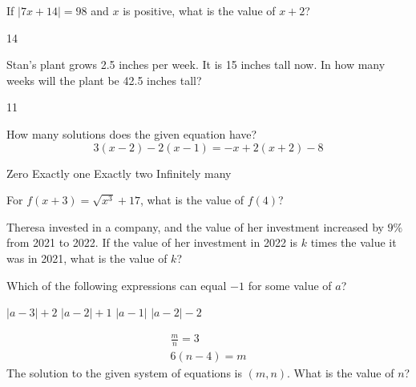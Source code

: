 \newpage




\question[1]
If $|7x+14|=98$ and $x$ is positive, what is the value of $x+2$?
\begin{solution}
14
\end{solution}

\question[1]
Stan's plant grows 2.5 inches per week. It is 15 inches tall now. In how many weeks will the plant be 42.5 inches tall?
\begin{solution}
11
\end{solution}

\question[1]
How many solutions does the given equation have?
\[
  3(x-2)-2(x-1)=-x+2(x+2)-8
\]
\begin{choices}
  \choice Zero
  \choice Exactly one
  \choice Exactly two
  \CorrectChoice Infinitely many
\end{choices}

\question[1]
For $f(x+3)=\sqrt{x^3}+17$, what is the value of $f(4)$?
\begin{choices}
\end{choices}





\newpage



\question[1]
Theresa invested in a company, and the value of her investment increased by $9\%$ from 2021 to 2022. If the value of her investment in 2022 is $k$ times the value it was in 2021, what is the value of $k$?
\begin{choices}
\end{choices}

\question[1]
Which of the following expressions can equal $-1$ for some value of $a$?
\begin{choices}
  \choice $|a-3|+2$
  \choice $|a-2|+1$
  \choice $|a-1|$
  \CorrectChoice $|a-2|-2$
\end{choices}

\question[1]
\[
  \begin{gathered}
  \frac{m}{n}=3 \\
  6(n-4)=m
  \end{gathered}
\]
The solution to the given system of equations is $(m, n)$. What is the value of $n$?
\begin{choices}
\end{choices}





